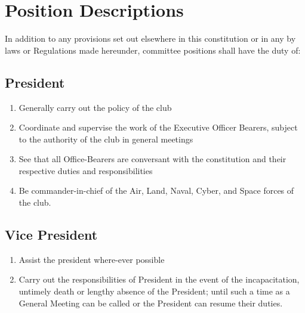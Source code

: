 \documentclass[10pt,a4paper]{report}
\begin{document}
	\section{Position Descriptions}
	In addition to any provisions set out elsewhere in this constitution or in any by laws or Regulations made hereunder, committee positions shall have the duty of:
		\subsection{President}
			\begin{enumerate}[label=\alph*]
				\item Generally carry out the policy of the club
				\item Coordinate and supervise the work of the Executive Officer Bearers, subject to the authority of the club in general meetings
				\item See that all Office-Bearers are conversant with the constitution and their respective duties and responsibilities
				\item Be commander-in-chief of the Air, Land, Naval, Cyber, and Space forces of the club.
			\end{enumerate}
		\subsection{Vice President}
			\begin{enumerate}[label=\alph*]
				\item Assist the president where-ever possible
				\item Carry out the responsibilities of President in the event of the incapacitation, untimely death or lengthy absence of the President; until such a time as a General Meeting can be called or the President can resume their duties.
			\end{enumerate}
\end{document}
